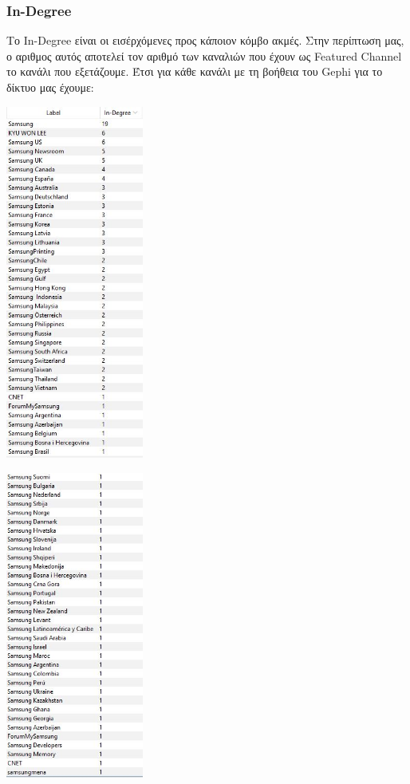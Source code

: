 \documentclass[12pt]{article}
\begin{document}
	\subsubsection{In-Degree} %
	Το In-Degree είναι οι εισέρχόμενες προς κάποιον κόμβο ακμές. Στην περίπτωση μας, ο αριθμος αυτός αποτελεί τον αριθμό των καναλιών που έχουν ως Featured Channel το κανάλι που εξετάζουμε. Έτσι για κάθε κανάλι με τη βοήθεια του Gephi για το δίκτυο μας έχουμε:		
	\begin{center}
		\begin{adjustbox}{valign=t, valign=}
			\includegraphics[width=0.34\textwidth]{photos-files/section6/in-degree1.JPG}
		\end{adjustbox}
		\hfill
		\begin{adjustbox}{valign=t}
			\includegraphics[width=0.34\textwidth]{photos-files/section6/in-degree2.JPG}
		\end{adjustbox}
	\end{center}
\end{document}
